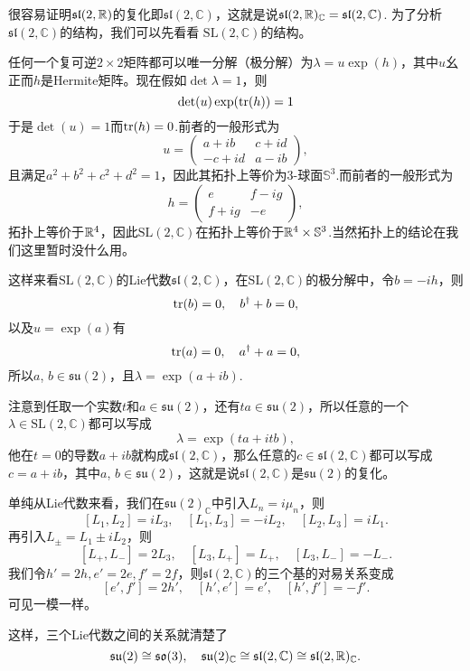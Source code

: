 \documentclass[9pt]{extarticle}
\newcommand{\cc}{\mathbb{C}}
\begin{document}
很容易证明$\mathfrak{sl}(2,\mathbb{R})$的复化即$\mathfrak{sl}(2,\cc)$，这就是说$\mathfrak{sl}(2,\rr)_\cc=\mathfrak{sl}(2,\cc)$. 为了分析$\mathfrak{sl}(2,\cc)$的结构，我们可以先看看
$\mathrm{SL}(2,\mathbb{C})$的结构。

任何一个复可逆$2\times 2$矩阵都可以唯一分解（极分解）为$
\lambda=u\exp(h)$，其中$u$幺正而$h$是Hermite矩阵。现在假如$\det \lambda=1$，则
\[
\det(u)\exp(\operatorname{tr}(h))=1
\]
于是$\det(u)=1$而$\operatorname{tr}(h)=0$.前者的一般形式为
\[
u=
\begin{pmatrix}
a+ib&c+id\\
-c+id&a-ib
\end{pmatrix},
\]
且满足$a^2+b^2+c^2+d^2=1$，因此其拓扑上等价为3-球面$\mathbb{S}^3$.而前者的一般形式为
\[
h=\begin{pmatrix}
e&f-ig\\
f+ig&-e
\end{pmatrix},
\]
拓扑上等价于$\mathbb{R}^4$，因此$\mathrm{SL}(2,\cc)$在拓扑上等价于$\mathbb{R}^4\times \mathbb{S}^3$.当然拓扑上的结论在我们这里暂时没什么用。

这样来看$\mathrm{SL}(2,\cc)$的Lie代数$\mathfrak{sl}(2,\mathbb{C})$，在$\mathrm{SL}(2,\cc)$的极分解中，令$b=-ih$，则
\[
\operatorname{tr}(b)=0,\quad b^\dag+b=0,
\]
以及$u=\exp(a)$有
\[
\operatorname{tr}(a)=0,\quad a^\dag+a=0,
\]
所以$a$, $b\in\mathfrak{su}(2)$，且$\lambda=\exp(a+ib)$.

注意到任取一个实数$t$和$a\in\mathfrak{su}(2)$，还有$ta \in\mathfrak{su}(2)$，所以任意的一个$\lambda \in \mathrm{SL}(2,\cc)$都可以写成
\[
	\lambda=\exp(ta+itb),
\]
他在$t=0$的导数$a+ib$就构成$\mathfrak{sl}(2,\cc)$，那么任意的$c\in \mathfrak{sl}(2,\cc)$都可以写成$c=a+ib$，其中$a$, $b\in\mathfrak{su}(2)$，这就是说$\mathfrak{sl}(2,\cc)$是$\mathfrak{su}(2)$的复化。

单纯从Lie代数来看，我们在$\mathfrak{su}(2)_\cc$中引入$L_n=i\mu_n$，则
\[
	[L_1,L_2]=iL_3,\quad [L_1,L_3]=-iL_2,\quad [L_2,L_3]=iL_1.
\]
再引入$L_\pm=L_1\pm iL_2$，则
\[
	[L_+,L_-]=2L_3,\quad [L_3,L_+]=L_+,\quad [L_3,L_-]=-L_-.
\]
我们令$h'=2h,e'=2e,f'=2f$，则$\mathfrak{sl}(2,\cc)$的三个基的对易关系变成
\[
[e',f']=2h',\quad[h',e']=e',\quad[h',f']=-f'.
\]
可见一模一样。

这样，三个Lie代数之间的关系就清楚了
\[
	\mathfrak{su}(2)\cong\mathfrak{so}(3),\quad \mathfrak{su}(2)_\cc\cong \mathfrak{sl}(2,\mathbb{C}) \cong\mathfrak{sl}(2,\rr)_\cc.
\]
\end{document}
